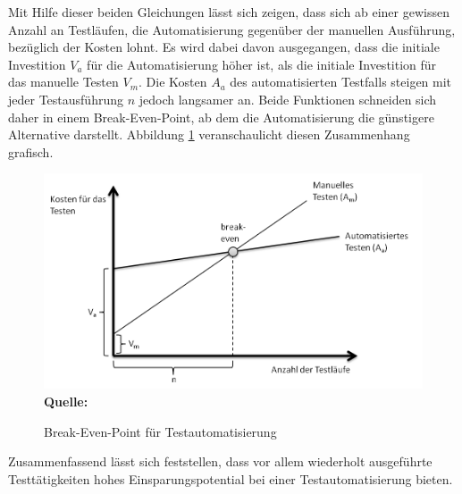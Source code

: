 Mit Hilfe dieser beiden Gleichungen lässt sich zeigen, dass sich ab einer gewissen Anzahl an Testläufen, die Automatisierung gegenüber der manuellen Ausführung, bezüglich der Kosten lohnt.
Es wird dabei davon ausgegangen, dass die initiale Investition \(V_a\) für die Automatisierung höher ist, als die initiale Investition für das manuelle Testen \(V_m\).
Die Kosten \(A_a\) des automatisierten Testfalls steigen mit jeder Testausführung \(n\) jedoch langsamer an. Beide Funktionen schneiden sich daher in einem Break-Even-Point, ab dem die Automatisierung die günstigere Alternative darstellt.
Abbildung \ref{fig:breakEven} veranschaulicht diesen Zusammenhang grafisch.

\begin{figure}[htb]
  \centering  
  \includegraphics[scale=0.8]{img/breakeven.png}\\
  \footnotesize\sffamily\textbf{Quelle:} \cite{ramler_economic_2006}
  \caption{Break-Even-Point für Testautomatisierung}
  \label{fig:breakEven}
\end{figure}

Zusammenfassend lässt sich feststellen, dass vor allem wiederholt ausgeführte Testtätigkeiten hohes Einsparungspotential bei einer Testautomatisierung bieten.


